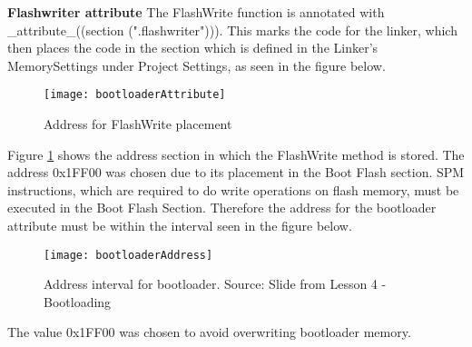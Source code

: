 	\textbf{Flashwriter attribute} \newline
		The FlashWrite function is annotated with \_attribute\_((section (".flashwriter"))). This marks the code for the linker, which then places the code in the  section which is defined in the Linker's MemorySettings under Project Settings, as seen in the figure below.
		
			\begin{figure}[H]
				\centering
				\texttt{[image: bootloaderAttribute]}
				\caption{Address for FlashWrite placement}
				\label{fig:flashwriter}
			\end{figure}
		
		Figure \ref{fig:flashwriter} shows the address section in which the FlashWrite method is stored. The address 0x1FF00 was chosen due to its placement in the Boot Flash section. SPM instructions, which are required to do write operations on flash memory, must be executed in the Boot Flash Section. Therefore the address for the bootloader attribute must be within the interval seen in the figure below.
		
			\begin{figure}[H]
				\centering
				\texttt{[image: bootloaderAddress]}
				\caption{Address interval for bootloader.  Source: Slide from Lesson 4 - Bootloading}
				\label{fig:bootloaderAddress}
			\end{figure}
	
		The value 0x1FF00 was chosen to avoid overwriting bootloader memory.
